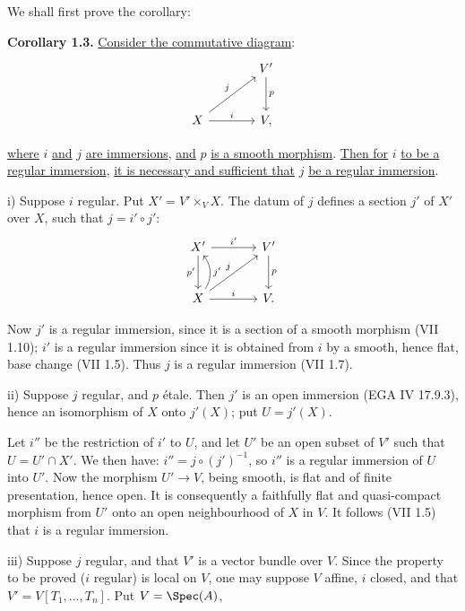 We shall first prove the corollary:

\textbf{Corollary 1.3.} \uline{Consider the commutative diagram}:
\[
\begin{tikzcd}[column sep=large,row sep=large]
& V' \arrow[d,"p"]\\
X \arrow[ur,"j"] \arrow[r,"i"] & V ,
\end{tikzcd}
\]

%
\uline{where} $i$ \uline{and} $j$
\uline{are immersions}, \uline{and} $p$ \uline{is a smooth morphism}. \uline{Then for} $i$ \uline{to be a regular immersion}, \uline{it is necessary and sufficient that} $j$ \uline{be a regular immersion}.

i) Suppose $i$ regular. Put $X'=V'\times_V X$. The datum of $j$ defines a section $j'$ of $X'$ over $X$, such that $j=i'\circ j'$:
\[
\begin{tikzcd}[column sep=large,row sep=large]
X' \arrow[r,"i'"] \arrow[d,"p'"'] & V' \arrow[d,"p"]\\
X \arrow[r,"i"] \arrow[ur,"j"] \arrow[u,bend right=35,"j'"'] & V .
\end{tikzcd}
\]

Now $j'$ is a regular immersion, since it is a section of a smooth morphism (VII 1.10); $i'$ is a regular immersion since it is obtained from $i$ by a smooth, hence flat, base change (VII 1.5). Thus $j$ is a regular immersion (VII 1.7).

ii) Suppose $j$ regular, and $p$ étale. Then $j'$ is an open immersion (EGA IV 17.9.3), hence an isomorphism of $X$ onto $j'(X)$; put $U=j'(X)$.

Let $i''$ be the restriction of $i'$ to $U$, and let $U'$ be an open subset of $V'$ such that $U=U'\cap X'$. We then have: $i''=j\circ(j')^{-1}$, so $i''$ is a regular immersion of $U$ into $U'$. Now the morphism $U'\to V$, being smooth, is flat and of finite presentation, hence open. It is consequently a faithfully flat and quasi-compact morphism from $U'$ onto an open neighbourhood of $X$ in $V$. It follows (VII 1.5) that $i$ is a regular immersion.

iii) Suppose $j$ regular, and that $V'$ is a vector bundle over $V$. Since the property to be proved ($i$ regular) is local on $V$, one may suppose $V$ affine, $i$ closed, and that $V'=V[T_1,\ldots,T_n]$. Put $V=\Spec(A)$,

